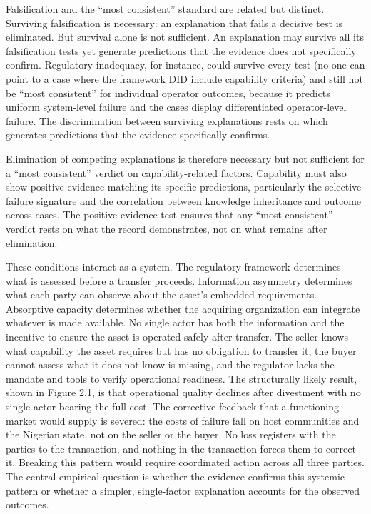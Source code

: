 \documentclass[twoside,fontset=lmodern]{mitthesis}
\begin{document}
Falsification and the ``most consistent'' standard are related but
distinct. Surviving falsification is necessary: an explanation that
fails a decisive test is eliminated. But survival alone is not
sufficient. An explanation may survive all its falsification tests yet
generate predictions that the evidence does not specifically confirm.
Regulatory inadequacy, for instance, could survive every test (no one
can point to a case where the framework DID include capability criteria)
and still not be ``most consistent'' for individual operator outcomes,
because it predicts uniform system-level failure and the cases display
differentiated operator-level failure. The discrimination between
surviving explanations rests on which generates predictions that the
evidence specifically confirms.

Elimination of competing explanations is therefore necessary but not
sufficient for a ``most consistent'' verdict on capability-related
factors. Capability must also show positive evidence matching its
specific predictions, particularly the selective failure signature and
the correlation between knowledge inheritance and outcome across cases.
The positive evidence test ensures that any ``most consistent'' verdict
rests on what the record demonstrates, not on what remains after
elimination.

These conditions interact as a system. The regulatory framework
determines what is assessed before a transfer proceeds. Information
asymmetry determines what each party can observe about the asset's
embedded requirements. Absorptive capacity determines whether the
acquiring organization can integrate whatever is made available. No
single actor has both the information and the incentive to ensure the
asset is operated safely after transfer. The seller knows what
capability the asset requires but has no obligation to transfer it, the
buyer cannot assess what it does not know is missing, and the regulator
lacks the mandate and tools to verify operational readiness. The
structurally likely result, shown in Figure 2.1, is that operational
quality declines after divestment with no single actor bearing the full
cost. The corrective feedback that a functioning market would supply is
severed: the costs of failure fall on host communities and the Nigerian
state, not on the seller or the buyer. No loss registers with the
parties to the transaction, and nothing in the transaction forces them
to correct it. Breaking this pattern would require coordinated action
across all three parties. The central empirical question is whether the
evidence confirms this systemic pattern or whether a simpler,
single-factor explanation accounts for the observed outcomes.
\end{document}
